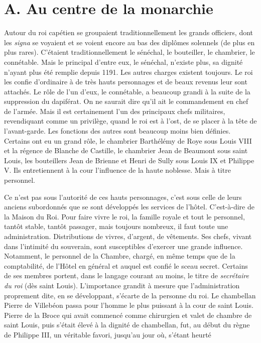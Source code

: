 \documentclass[french,twoside]{book} %
\begin{document}
\section[A. Au centre de la monarchie]{A. Au centre de la monarchie}
\label{c04a}
\noindent  {}
\label{p37} Autour du roi capétien se groupaient traditionnellement les grands officiers, dont les {\itshape signa} se voyaient et se voient encore au bas des diplômes solennels (de plus en plus rares). C’étaient traditionnellement le sénéchal, le bouteiller, le chambrier, le connétable. Mais le principal d’entre eux, le sénéchal, n’existe plus, sa dignité n’ayant plus été remplie depuis 1191. Les autres charges existent toujours. Le roi les confie d’ordinaire à de très hauts personnages et de beaux revenus leur sont attachés. Le rôle de l’un d’eux, le connétable, a beaucoup grandi à la suite de la suppression du dapiférat. On ne saurait dire qu’il ait le commandement en chef de l’armée. Mais il est certainement l’un des principaux chefs militaires, revendiquant comme un privilège, quand le roi est à l’ost, de se placer à la tête de l’avant-garde. Les fonctions des autres sont beaucoup moins bien définies. Certains ont eu un grand rôle, le chambrier Barthélémy de Roye sous Louis VIII et la régence de Blanche de Castille, le chambrier Jean de Beaumont sous saint Louis, les bouteillers Jean de Brienne et Henri de Sully sous Louis IX et Philippe V. Ils entretiennent à la cour l’influence de la haute noblesse. Mais à titre personnel.\par
Ce n’est pas sous l’autorité de ces hauts personnages, c’est sous celle de leurs anciens subordonnés que se sont développés les services de l’hôtel. C’est-à-dire de la Maison du Roi. Pour faire vivre le roi, la famille royale et tout le personnel, tantôt stable, tantôt passager, mais toujours nombreux, il faut toute une administration. Distributions de vivres, d’argent, de vêtements. Ses chefs, vivant dans l’intimité du souverain, sont susceptibles d’exercer une grande influence. Notamment, le personnel de la Chambre, chargé, en même temps que de la comptabilité, de l’Hôtel en général et auquel est confié le sceau secret. Certains de ses membres portent, dans le langage courant au moins, le titre de \emph{secrétaire du roi} (dès saint Louis). L’importance grandit à mesure que l’administration proprement dite, en se développant, s’écarte de la personne du roi. Le chambellan Pierre de Villebéon passa pour l’homme le plus puissant à la cour de saint Louis. Pierre de la Broce qui avait commencé comme chirurgien et valet de chambre de saint Louis, puis s’était élevé à la dignité de chambellan, fut, au début du règne de Philippe III, un véritable favori, jusqu’au jour où, s’étant heurté  
\end{document}
